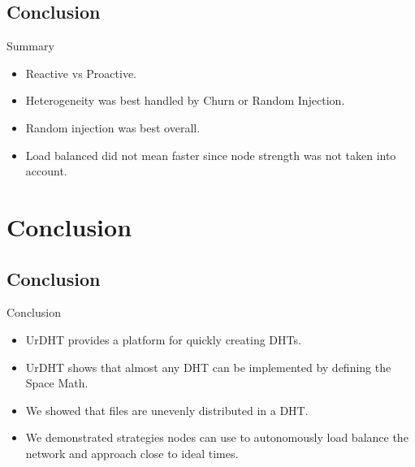 \documentclass[11pt]{beamer}
\begin{document}
\subsection{Conclusion}

\begin{frame}{Summary}
	\begin{itemize}
		
		\item Reactive vs Proactive.
		\item Heterogeneity was best handled by Churn or Random Injection.
		\item Random injection was best overall.
		\item Load balanced did not mean faster since node strength was not taken into account.
	\end{itemize}
\end{frame}

\section{Conclusion}

\subsection{Conclusion}

\begin{frame}{Conclusion}
	\begin{itemize}
		\item UrDHT provides a platform for quickly creating DHTs.
		\item UrDHT shows that almost any DHT can be implemented by defining the Space Math.
		\item We showed that files are  unevenly distributed in a DHT.
		\item We demonstrated strategies nodes can use to autonomously load balance the network and approach close to ideal times.
	\end{itemize}
\end{frame}
\end{document}
